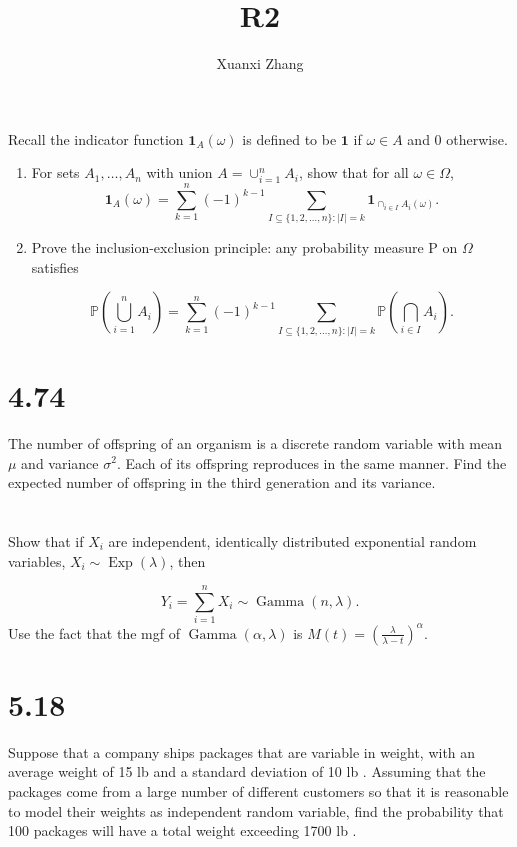 \documentclass{article}%
\title{\huge R2\\
\normalsize}
\author{Xuanxi Zhang}
\begin{document}
\maketitle

\section{}
Recall the indicator function $\mathbf{1}_A(\omega)$ is defined to be $\mathbf{1}$ if $\omega \in A$ and 0 otherwise.
\begin{enumerate}
    \item For sets $A_1, \ldots, A_n$ with union $A=\cup_{i=1}^n A_i$, show that for all $\omega \in \Omega$,
$$
\mathbf{1}_A(\omega)=\sum_{k=1}^n(-1)^{k-1} \sum_{I \subseteq\{1,2, \ldots, n\}:|I|=k} \mathbf{1}_{\cap_{i\in I}A_i(\omega)} .
$$
\item Prove the inclusion-exclusion principle: any probability measure P on $\Omega$ satisfies

$$
\mathbb{P}\left(\bigcup_{i=1}^n A_i\right)=\sum_{k=1}^n(-1)^{k-1} \sum_{I \subseteq\{1,2, \ldots, n\}:|I|=k} \mathbb{P}\left(\bigcap_{i \in I} A_i\right) .
$$
\end{enumerate}



\section{4.74}
The number of offspring of an organism is a discrete random variable with mean $\mu$ and variance $\sigma^2$. Each of its offspring reproduces in the same manner. Find the expected number of offspring in the third generation and its variance.



\section{}
Show that if $X_i$ are independent, identically distributed exponential random variables, $X_i \sim \operatorname{Exp}(\lambda)$, then

$$
Y_i=\sum_{i=1}^n X_i \sim \operatorname{Gamma}(n, \lambda) .
$$
Use the fact that the mgf of $\operatorname{Gamma}(\alpha, \lambda)$ is $M(t)=\left(\frac{\lambda}{\lambda-t}\right)^\alpha$.


\section{5.18}
Suppose that a company ships packages that are variable in weight, with an average weight of 15 lb and a standard deviation of 10 lb . Assuming that the packages come from a large number of different customers so that it is reasonable to model their weights as independent random variable, find the probability that 100 packages will have a total weight exceeding 1700 lb .
\end{document}
